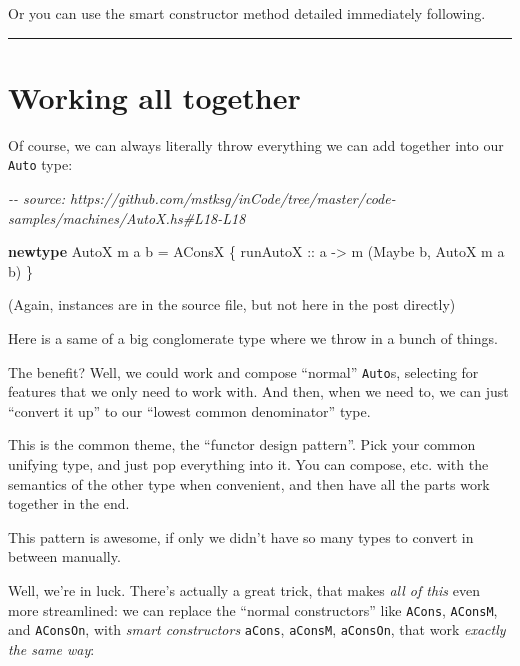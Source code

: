 \documentclass[]{article}
\newenvironment{Shaded}{}{}
\newcommand{\CommentTok}[1]{\textcolor[rgb]{0.38,0.63,0.69}{\textit{#1}}}
\newcommand{\DataTypeTok}[1]{\textcolor[rgb]{0.56,0.13,0.00}{#1}}
\newcommand{\KeywordTok}[1]{\textcolor[rgb]{0.00,0.44,0.13}{\textbf{#1}}}
\newcommand{\NormalTok}[1]{#1}
\newcommand{\OtherTok}[1]{\textcolor[rgb]{0.00,0.44,0.13}{#1}}
\begin{document}
Or you can use the smart constructor method detailed immediately following.

\begin{center}\rule{0.5\linewidth}{0.5pt}\end{center}

\section{Working all together}\label{working-all-together}

Of course, we can always literally throw everything we can add together into our
\texttt{Auto} type:

\begin{Shaded}
\begin{Highlighting}[]
\CommentTok{{-}{-} source: https://github.com/mstksg/inCode/tree/master/code{-}samples/machines/AutoX.hs\#L18{-}L18}

\KeywordTok{newtype} \DataTypeTok{AutoX}\NormalTok{ m a b }\OtherTok{=} \DataTypeTok{AConsX}\NormalTok{ \{}\OtherTok{ runAutoX ::}\NormalTok{ a }\OtherTok{{-}\textgreater{}}\NormalTok{ m (}\DataTypeTok{Maybe}\NormalTok{ b, }\DataTypeTok{AutoX}\NormalTok{ m a b) \}}
\end{Highlighting}
\end{Shaded}

(Again, instances are in the source file, but not here in the post directly)

Here is a same of a big conglomerate type where we throw in a bunch of things.

The benefit? Well, we could work and compose ``normal'' \texttt{Auto}s,
selecting for features that we only need to work with. And then, when we need
to, we can just ``convert it up'' to our ``lowest common denominator'' type.

This is the common theme, the ``functor design pattern''. Pick your common
unifying type, and just pop everything into it. You can compose, etc. with the
semantics of the other type when convenient, and then have all the parts work
together in the end.

This pattern is awesome, if only we didn't have so many types to convert in
between manually.

Well, we're in luck. There's actually a great trick, that makes \emph{all of
this} even more streamlined: we can replace the ``normal constructors'' like
\texttt{ACons}, \texttt{AConsM}, and \texttt{AConsOn}, with \emph{smart
constructors} \texttt{aCons}, \texttt{aConsM}, \texttt{aConsOn}, that work
\emph{exactly the same way}:
\end{document}
